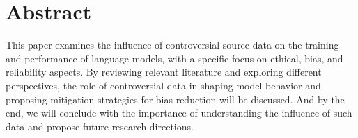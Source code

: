 \section{Abstract}

This paper examines the influence of controversial source data on the training and performance of language models, with a specific focus on ethical, bias, and reliability aspects. By reviewing relevant literature and exploring different perspectives, the role of controversial data in shaping model behavior and proposing mitigation strategies for bias reduction will be discussed. And by the end, we will conclude with the importance of understanding the influence of such data and propose future research directions.